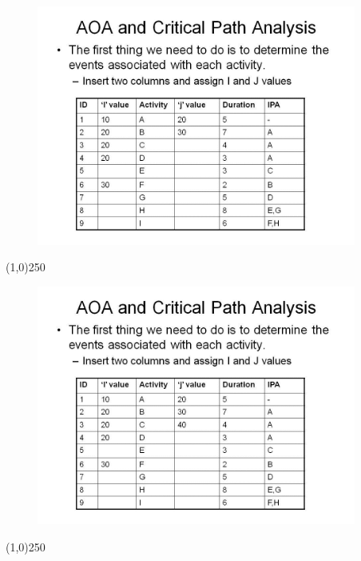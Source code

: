 \begin{frame}
\begin{figure}
	\centering
		\includegraphics[width = 10.5cm]{oldnotes/Slide66.jpg}
\end{figure}
\end{frame}
\begin{center}\line(1,0){250}\end{center}


\begin{frame}
\begin{figure}
	\centering
		\includegraphics[width = 10.5cm]{oldnotes/Slide67.jpg}
\end{figure}
\end{frame}
\begin{center}\line(1,0){250}\end{center}


